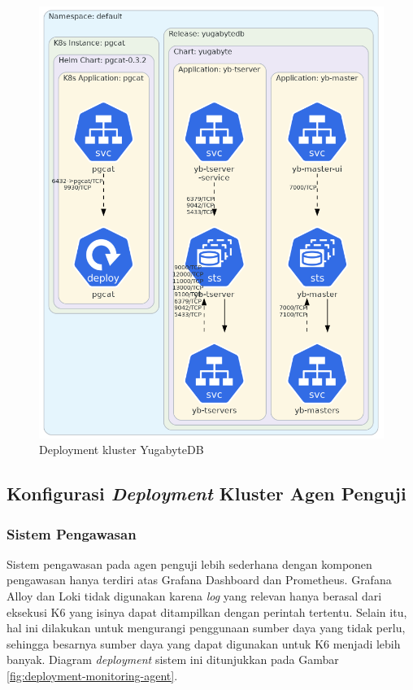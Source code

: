 \begin{figure}[H]
    \centering
    \includegraphics[width=1\textwidth]{resources/chapter-4/yugabyte.png}
    \caption{Deployment kluster YugabyteDB}
    \label{fig:deployment-yugabyte}
\end{figure}

\pagebreak

\subsection{Konfigurasi \textit{Deployment} Kluster Agen Penguji}

\subsubsection{Sistem Pengawasan}

Sistem pengawasan pada agen penguji lebih sederhana dengan komponen pengawasan hanya terdiri atas Grafana Dashboard dan Prometheus. Grafana Alloy dan Loki tidak digunakan karena \textit{log} yang relevan hanya berasal dari eksekusi K6 yang isinya dapat ditampilkan dengan perintah tertentu. Selain itu, hal ini dilakukan untuk mengurangi penggunaan sumber daya yang tidak perlu, sehingga besarnya sumber daya yang dapat digunakan untuk K6 menjadi lebih banyak. Diagram \textit{deployment} sistem ini ditunjukkan pada Gambar \ref{fig:deployment-monitoring-agent}.

